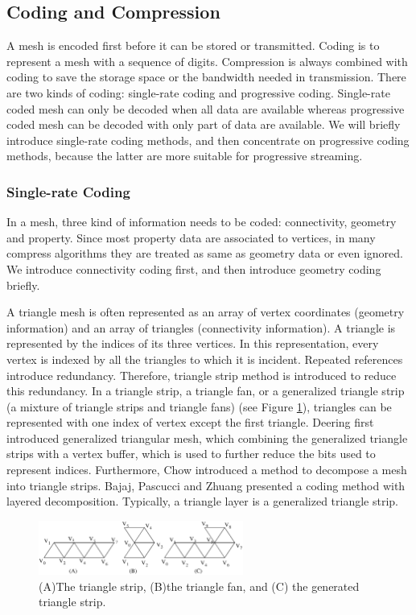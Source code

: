 \documentclass[11pt, a4paper]{report}
\begin{document}
    \subsection{Coding and Compression}
    A mesh is encoded first before it can be stored or
    transmitted. Coding is to represent a mesh with a sequence of
    digits. Compression is always combined with coding to save the storage space
    or the bandwidth needed in transmission. 
    There are two kinds of coding:
    single-rate coding and progressive coding. 
    Single-rate coded mesh can only be decoded when all data are available 
    whereas progressive coded mesh can be decoded with only part of data are available. 
    We will briefly introduce single-rate coding methods, and then concentrate on
    progressive coding methods, because the latter are more suitable for progressive streaming.
    
    \subsubsection{Single-rate Coding} \label{single_rate}
    In a mesh, three kind of information needs to be coded:
    connectivity, geometry and property. 
    Since most property data are associated to vertices, 
    in many compress algorithms they are treated as same as geometry data or even
    ignored. We introduce connectivity coding first, and then introduce geometry coding briefly.
    
    A triangle mesh is often represented as an array of vertex coordinates
    (geometry information) and an array of triangles (connectivity information). 
    A triangle is represented by the indices of its three vertices.
    In this representation, every vertex is indexed by all the
    triangles to which it is incident. Repeated references introduce
    redundancy. Therefore, triangle strip method is introduced to
    reduce this redundancy. In a triangle strip, a triangle fan, or a
    generalized triangle strip (a mixture of triangle strips and
    triangle fans) (see Figure \ref{strip}), 
    triangles can be represented with one index of vertex
    except the first triangle. 
    Deering \cite{218391} first introduced generalized triangular mesh, 
    which combining the generalized triangle strips with a vertex buffer,
    which is used to further reduce the bits used to represent indices. 
    Furthermore, Chow \cite{267103} introduced a method to
    decompose a mesh into triangle strips. 
    Bajaj, Pascucci and Zhuang \cite{789628} presented a coding method with layered
    decomposition. 
    Typically, a triangle layer is a generalized triangle strip. 
    \begin{figure}[ht]
    \centering
    \includegraphics[width=0.6\textwidth]{strip.eps}
    \caption{(A)The triangle strip, (B)the triangle fan, and (C) the generated triangle strip.}\label{strip}
    \end{figure}
\end{document}
